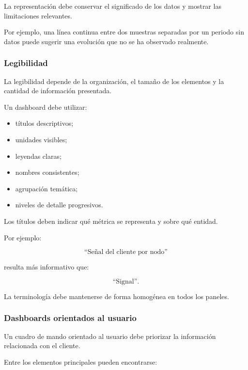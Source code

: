 La representación debe conservar el significado de los datos y mostrar
las limitaciones relevantes.

Por ejemplo, una línea continua entre dos muestras separadas por un
periodo sin datos puede sugerir una evolución que no se ha observado
realmente.


\subsubsection*{Legibilidad}

La legibilidad depende de la organización, el tamaño de los elementos y
la cantidad de información presentada.

Un dashboard debe utilizar:

\begin{itemize}
    \item títulos descriptivos;

    \item unidades visibles;

    \item leyendas claras;

    \item nombres consistentes;

    \item agrupación temática;

    \item niveles de detalle progresivos.
\end{itemize}

Los títulos deben indicar qué métrica se representa y sobre qué entidad.

Por ejemplo:

\[
    \text{``Señal del cliente por nodo''}
\]

resulta más informativo que:

\[
    \text{``Signal''}.
\]

La terminología debe mantenerse de forma homogénea en todos los paneles.


\subsubsection*{Dashboards orientados al usuario}

Un cuadro de mando orientado al usuario debe priorizar la información
relacionada con el cliente.

Entre los elementos principales pueden encontrarse:

